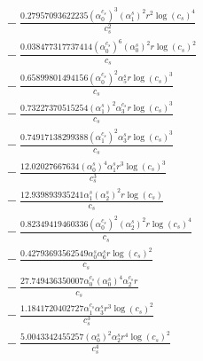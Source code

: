 \documentclass[10pt]{article}
\begin{document}
\begin{align*}
&{}  - \frac{0.27957093622235 \left(\alpha_{0}^{c_s}\right)^{3} \left(\alpha_{1}^s\right)^{2} r^{2} \log{\left(c_{s} \right)}^{4}}{c_{s}^{2}} \\
&{}  - \frac{0.038477317737414 \left(\alpha_{0}^{c_s}\right)^{6} \left(\alpha_{0}^s\right)^{2} r \log{\left(c_{s} \right)}^{2}}{c_{s}} \\
&{}  - \frac{0.65899801494156 \left(\alpha_{0}^{c_s}\right)^{2} \alpha_{5}^s r \log{\left(c_{s} \right)}^{3}}{c_{s}} \\
&{}  - \frac{0.73227370515254 \left(\alpha_{1}^s\right)^{2} \alpha_{3}^{c_s} r \log{\left(c_{s} \right)}^{3}}{c_{s}} \\
&{}  - \frac{0.74917138299388 \left(\alpha_{1}^{c_s}\right)^{2} \alpha_{3}^s r \log{\left(c_{s} \right)}^{3}}{c_{s}} \\
&{}  - \frac{12.02027667634 \left(\alpha_{0}^s\right)^{4} \alpha_{1}^s r^{3} \log{\left(c_{s} \right)}^{3}}{c_{s}^{3}} \\
&{}  - \frac{12.939893935241 \alpha_{1}^s \left(\alpha_{2}^s\right)^{2} r \log{\left(c_{s} \right)}}{c_{s}} \\
&{}  - \frac{0.82349419460336 \left(\alpha_{0}^{c_s}\right)^{2} \left(\alpha_{2}^s\right)^{2} r \log{\left(c_{s} \right)}^{4}}{c_{s}} \\
&{}  - \frac{0.42793693562549 \alpha_{0}^s \alpha_{6}^s r \log{\left(c_{s} \right)}^{2}}{c_{s}} \\
&{}  - \frac{27.749436350007 \alpha_{0}^{c_s} \left(\alpha_{0}^s\right)^{4} \alpha_{2}^{c_s} r}{c_{s}} \\
&{}  - \frac{1.1841720402727 \alpha_{1}^{c_s} \alpha_{3}^s r^{3} \log{\left(c_{s} \right)}^{2}}{c_{s}^{3}} \\
&{}  - \frac{5.0043342455257 \left(\alpha_{0}^s\right)^{2} \alpha_{2}^s r^{4} \log{\left(c_{s} \right)}^{2}}{c_{s}^{4}}
\end{align*}
\end{document}
